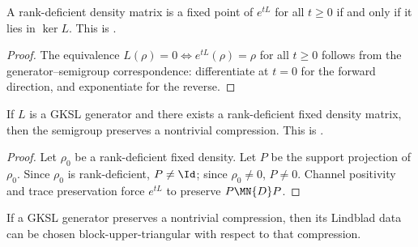 \begin{theorem}
    \label{thm:wolf_prop_7_6_one_iff_two}
    \leanok
    A rank-deficient density matrix is a fixed point of $e^{tL}$ for all
    $t\ge0$ if and only if it lies in $\ker L$.
    This is \cite[Proposition~7.6, (1)$\Leftrightarrow$(2)]{Wolf2012Quantum}.
\end{theorem}

\begin{proof}\leanok
    The equivalence $L(\rho)=0\iff e^{tL}(\rho)=\rho$ for all $t\ge0$
    follows from the generator--semigroup correspondence: differentiate
    at $t=0$ for the forward direction, and exponentiate for the reverse.
\end{proof}

\begin{theorem}
    \label{thm:wolf_prop_7_6_one_implies_three}
    \leanok
    If $L$ is a GKSL generator and there exists a rank-deficient fixed
    density matrix, then the semigroup preserves a nontrivial compression.
    This is \cite[Proposition~7.6, (1)$\Rightarrow$(3)]{Wolf2012Quantum}.
\end{theorem}

\begin{proof}\leanok
    Let $\rho_0$ be a rank-deficient fixed density.
    Let $P$ be the support projection of $\rho_0$.
    Since $\rho_0$ is rank-deficient, $P\neq\Id$;
    since $\rho_0\neq0$, $P\neq0$.
    Channel positivity and trace preservation force $e^{tL}$ to
    preserve $P\MN{D}P$.
\end{proof}

\begin{theorem}
    \label{thm:hasBlockUpperTriangularLindblad_of_hasInvariantCompression_ch12}
    \leanok
    If a GKSL generator preserves a nontrivial compression, then its Lindblad data can be chosen
    block-upper-triangular with respect to that compression.
\end{theorem}

